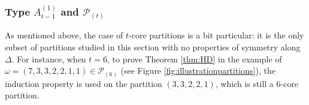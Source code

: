 \documentclass[11pt,letterpaper]{amsart}
\def\bbbz{\mathbb Z}
\def\cch{\mathcal H}
\def\ccdd{\mathcal {DD}}
\def\ccp{\mathcal P}
\numberwithin{equation}{section}
\numberwithin{df}{section}
\begin{document}
%
%
%



\subsubsection{Type $A^{(1)}_{t-1}$ and $\ccp_{(t)}$}

As mentioned above, the case of $t$-core partitions is a bit particular: it is the only subset of partitions studied in this section with no properties of symmetry along $\Delta$. For instance, when $t=6$, to prove Theorem \ref{thm:HD} in the example of $\omega=(7,3,3,2,2,1,1)\in\ccp_{(6)}$ (see Figure \ref{fig:illustrationpartitions}), the induction property is used on the partition $(3,3,2,2,1)$, which is still a $6$-core partition.
\end{document}
